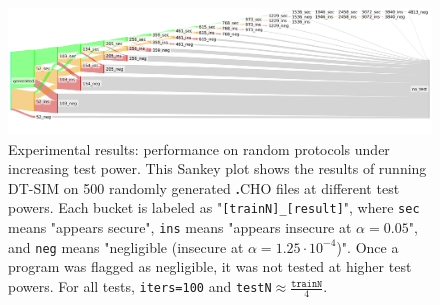 \documentclass[acmlarge, manuscript, screen, review, anonymous, table]{acmart}
\newcommand{\langname}{\textsc{\textbf{.}CHO}\xspace}
\newcommand{\toolname}{\textsc{DT-SIM}\xspace}
\begin{document}
\begin{figure}[tbhp]
  \newcommand{\gsize}{.9\textwidth}
  \includegraphics[width=\gsize]{graphs/medium2.old.pdf}
  \caption{Experimental results: performance on random protocols under increasing test power.
    This Sankey plot shows the results of running \toolname on 500 randomly generated \langname files at different test powers.
    Each bucket is labeled as "\texttt{[trainN]\_[result]}", where \texttt{sec} means "appears secure",
    \texttt{ins} means "appears insecure at $\alpha=0.05$",
    and \texttt{neg} means "negligible (insecure at $\alpha=1.25 \cdot 10^{-4}$)".
    Once a program was flagged as negligible, it was not tested at higher test powers.
    For all tests, \texttt{iters=100} and \texttt{testN$\approx\!\!\frac{\mathtt{trainN}}{4}$}.
    }
  \label{fig:sankey}
\end{figure}
\end{document}
